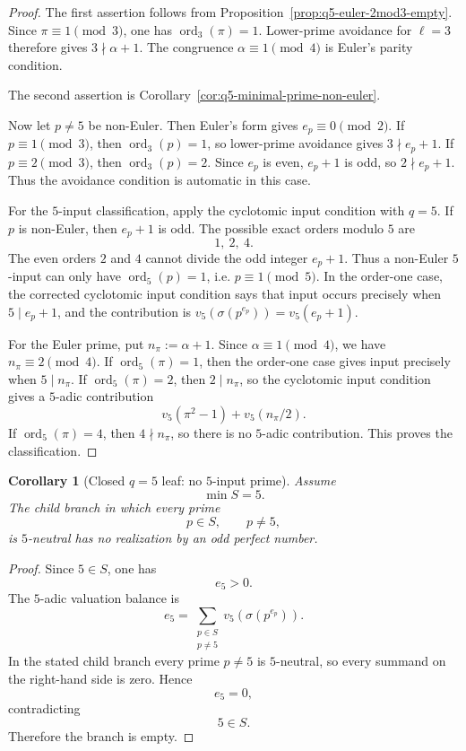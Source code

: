 \documentclass[11pt]{article}
\newtheorem{corollary}[theorem]{Corollary}
\theoremstyle{definition}
\theoremstyle{remark}
\DeclareMathOperator{\ord}{ord}
\begin{document}
\begin{proof}
The first assertion follows from
Proposition~\ref{prop:q5-euler-2mod3-empty}.  Since $\pi\equiv1\pmod3$, one has
\(\ord_3(\pi)=1\).  Lower-prime avoidance for \(\ell=3\) therefore gives
\(3\nmid\alpha+1\).  The congruence \(\alpha\equiv1\pmod4\) is Euler's parity
condition.

The second assertion is Corollary~\ref{cor:q5-minimal-prime-non-euler}.

Now let $p\ne5$ be non-Euler.  Then Euler's form gives
\(e_p\equiv0\pmod2\).
If $p\equiv1\pmod3$, then $\ord_3(p)=1$, so lower-prime avoidance gives
\(3\nmid e_p+1\).
If $p\equiv2\pmod3$, then $\ord_3(p)=2$.  Since $e_p$ is even,
\(e_p+1\) is odd, so \(2\nmid e_p+1\).
Thus the avoidance condition is automatic in this case.

For the $5$-input classification, apply the cyclotomic input condition with
$q=5$.  If $p$ is non-Euler, then $e_p+1$ is odd.  The possible exact orders
modulo $5$ are
\[
  1,\ 2,\ 4.
\]
The even orders $2$ and $4$ cannot divide the odd integer $e_p+1$.  Thus a
non-Euler \(5\)-input can only have \(\ord_5(p)=1\), i.e.
\(p\equiv1\pmod5\).
In the order-one case, the corrected cyclotomic input condition says that input
occurs precisely when \(5\mid e_p+1\), and the contribution is
\(v_5(\sigma(p^{e_p}))=v_5(e_p+1)\).

For the Euler prime, put \(n_\pi:=\alpha+1\).  Since
\(\alpha\equiv1\pmod4\), we have \(n_\pi\equiv2\pmod4\).
If $\ord_5(\pi)=1$, then the order-one case gives input precisely when
\(5\mid n_\pi\).
If $\ord_5(\pi)=2$, then $2\mid n_\pi$, so the cyclotomic input condition gives
a $5$-adic contribution
\[
  v_5(\pi^2-1)+v_5(n_\pi/2).
\]
If $\ord_5(\pi)=4$, then $4\nmid n_\pi$, so there is no $5$-adic contribution.
This proves the classification.
\end{proof}

\begin{corollary}[Closed $q=5$ leaf: no $5$-input prime]
\label{cor:q5-no-input-leaf-empty}
Assume
\[
  \min S=5.
\]
The child branch in which every prime
\[
  p\in S,\qquad p\ne5,
\]
is $5$-neutral has no realization by an odd perfect number.
\end{corollary}

\begin{proof}
Since $5\in S$, one has
\[
  e_5>0.
\]
The $5$-adic valuation balance is
\[
  e_5
  =
  \sum_{\substack{p\in S\\p\ne5}}
  v_5(\sigma(p^{e_p})).
\]
In the stated child branch every prime $p\ne5$ is $5$-neutral, so every summand
on the right-hand side is zero.  Hence
\[
  e_5=0,
\]
contradicting
\[
  5\in S.
\]
Therefore the branch is empty.
\end{proof}
\end{document}
